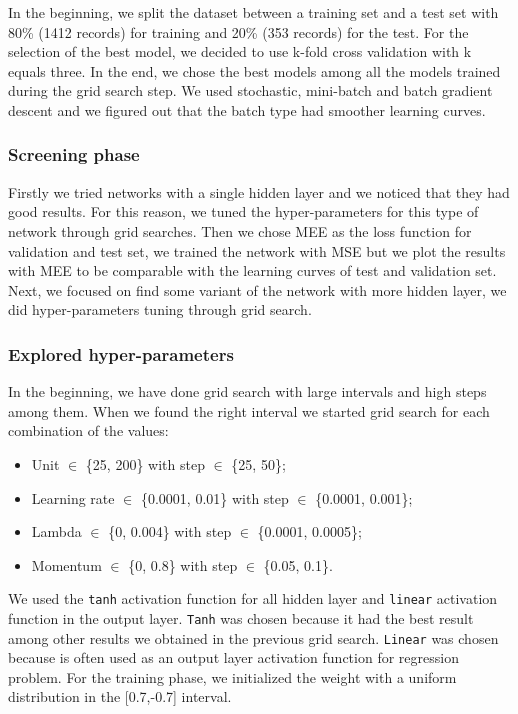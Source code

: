 In the beginning, we split the dataset between a training set and a test set with 80\% (1412 records) for training and 20\% (353 records) for the test. For the selection of the best model, we decided to use k-fold cross validation with k equals three. In the end, we chose the best models among all the models trained during the grid search step. We used stochastic, mini-batch and batch gradient descent and we figured out that the batch type had smoother learning curves.

\subsubsection{Screening phase}

Firstly we tried networks with a single hidden layer and we noticed that they had good results. For this reason, we tuned the hyper-parameters for this type of network through grid searches.
Then we chose MEE as the loss function for validation and test set, we trained the network with MSE but we plot the results with MEE to be comparable with the learning curves of test and validation set.
Next, we focused on find some variant of the network with more hidden layer, we did hyper-parameters tuning through grid search.

\subsubsection{Explored hyper-parameters}
In the beginning, we have done grid search with large intervals and high steps among them. When we found the right interval we started grid search for each combination of the values:

\begin{itemize}
	\item Unit $\in$ \{25, 200\} with step $\in$ \{25, 50\};
	\item Learning rate $\in$ \{0.0001, 0.01\} with step $\in$ \{0.0001, 0.001\};
	\item Lambda $\in$ \{0, 0.004\} with step $\in$ \{0.0001,  0.0005\};
	\item Momentum $\in$ \{0, 0.8\} with step $\in$ \{0.05,  0.1\}.
\end{itemize}
\vspace{0.3cm}
We used the \texttt{tanh} activation function for all hidden layer and \texttt{linear} activation function in the output layer. \texttt{Tanh} was chosen because it had the best result among other results we obtained in the previous grid search. \texttt{Linear} was chosen because is often used as an output layer activation function for regression problem.
For the training phase, we initialized the weight with a uniform distribution in the [0.7,-0.7] interval.


